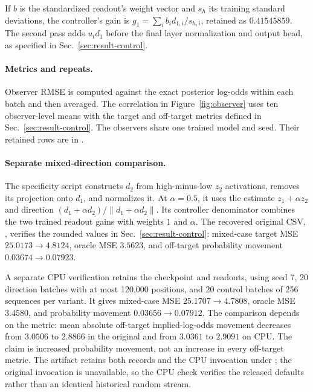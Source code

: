If $b$ is the standardized readout's weight vector and $s_h$ its training standard deviations, the controller's gain is $g_1=\sum_i b_i d_{1,i}/s_{h,i}$, retained as $0.41545859$. The second pass adds $u_t d_1$ before the final layer normalization and output head, as specified in Sec.~\ref{sec:result-control}.

\paragraph{Metrics and repeats.}
Observer RMSE is computed against the exact posterior log-odds within each batch and then averaged. The correlation in Figure~\ref{fig:observer} uses ten observer-level means with the target and off-target metrics defined in Sec.~\ref{sec:result-control}. The observers share one trained model and seed. Their retained rows are in .

\paragraph{Separate mixed-direction comparison.}
The specificity script constructs $d_2$ from high-minus-low $z_2$ activations, removes its projection onto $d_1$, and normalizes it. At $\alpha=0.5$, it uses the estimate $z_1+\alpha z_2$ and direction $(d_1+\alpha d_2)/\|d_1+\alpha d_2\|$. Its controller denominator combines the two trained readout gains with weights $1$ and $\alpha$. The recovered original CSV, , verifies the rounded values in Sec.~\ref{sec:result-control}: mixed-case target MSE $25.0173\to4.8124$, oracle MSE $3.5623$, and off-target probability movement $0.03674\to0.07923$.

A separate CPU verification retains the checkpoint and readouts, using seed 7, 20 direction batches with at most 120,000 positions, and 20 control batches of 256 sequences per variant. It gives mixed-case MSE $25.1707\to4.7808$, oracle MSE $3.4580$, and probability movement $0.03656\to0.07912$. The comparison depends on the metric: mean absolute off-target implied-log-odds movement decreases from $3.0506$ to $2.8866$ in the original and from $3.0361$ to $2.9091$ on CPU. The claim is increased probability movement, not an increase in every off-target metric. The artifact retains both records and the CPU invocation under ; the original invocation is unavailable, so the CPU check verifies the released defaults rather than an identical historical random stream.

